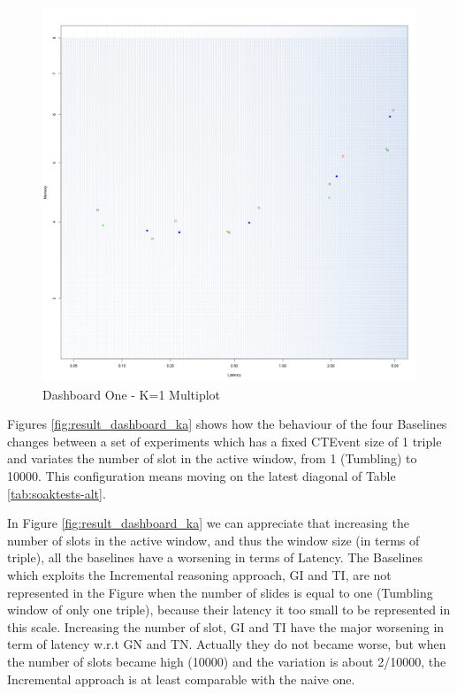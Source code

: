 \begin{figure}[htb]
	\centering
	\includegraphics[width=0.90\linewidth]{images/dashboard-1}	
	\caption[\textsc{Analyser} Investigation Stack - Level 0 - Dashboard One - Multiplot Version]{Dashboard One - K=1 Multiplot} 
	\label{fig:result_dashboard_kb}
\end{figure}

Figures \ref{fig:result_dashboard_ka} shows how the behaviour of the four Baselines changes between a set of experiments which has a fixed CTEvent size of 1 triple and variates the number of slot in the active window, from 1 (Tumbling) to 10000. This configuration means moving on the latest diagonal of Table \ref{tab:soaktests-alt}.

In Figure \ref{fig:result_dashboard_ka} we can appreciate that increasing the number of slots in the active window, and thus the window size (in terms of triple), all the baselines have a worsening in terms of Latency. The Baselines which exploits the Incremental reasoning approach, GI and TI, are not represented in the Figure when the number of slides is equal to one (Tumbling window of only one triple), because their latency it too small to be represented in this scale. Increasing the number of slot, GI and TI have the major worsening in term of latency w.r.t GN and TN. Actually they do not became worse, but when the number of slots became high (10000) and the variation is about 2/10000, the Incremental approach is at least comparable with the naive one.

